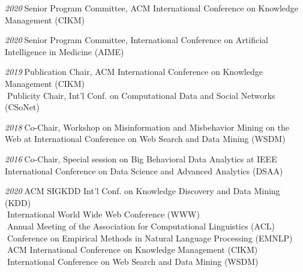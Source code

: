 \documentclass[10pt]{article}
\newenvironment{myindentpar}[1]%
{\begin{list}{}%
         {\setlength{\leftmargin}{#1}}%
         \item[]%
}
{\end{list}}
\newcounter{list}
\begin{document}
\begin{myindentpar}{0.75cm}

\hspace{-0.75cm}{\bf Organizing Committee}

{\small

\hspace{-0.75cm}\emph{2020}\textcolor{white}{.}Senior Program Committee, ACM International Conference on Knowledge Management (CIKM)

\hspace{-0.75cm}\emph{2020}\textcolor{white}{.}Senior Program Committee, International Conference on Artificial Intelligence in Medicine (AIME)

\hspace{-0.75cm}\emph{2019}\textcolor{white}{.}Publication Chair, ACM International Conference on Knowledge Management (CIKM) \\
\textcolor{white}{.}Publicity Chair, Int'l Conf. on Computational Data and Social Networks (CSoNet)

\hspace{-0.75cm}\emph{2018}\textcolor{white}{.}Co-Chair, Workshop on Misinformation and Misbehavior Mining on the Web at International Conference on Web Search and Data Mining (WSDM)

\hspace{-0.75cm}\emph{2016}\textcolor{white}{.}Co-Chair, Special session on Big Behavioral Data Analytics at IEEE International Conference on Data Science and Advanced Analytics (DSAA)

}


\hspace{-0.75cm}{\bf Program Committee}

{\small

\hspace{-0.75cm}\emph{2020}\textcolor{white}{.}ACM SIGKDD Int'l Conf. on Knowledge Discovery and Data Mining (KDD) \\
\textcolor{white}{.}International World Wide Web Conference (WWW) \\
\textcolor{white}{.}Annual Meeting of the Association for Computational Linguistics (ACL) \\
\textcolor{white}{.}Conference on Empirical Methods in Natural Language Processing (EMNLP) \\
\textcolor{white}{.}ACM International Conference on Knowledge Management (CIKM) \\
\textcolor{white}{.}International Conference on Web Search and Data Mining (WSDM)

}
\end{myindentpar}
\end{document}
